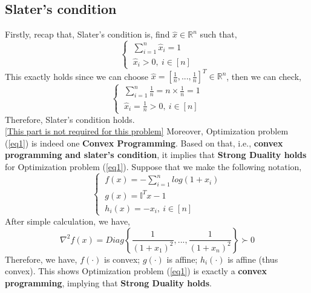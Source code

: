 \documentclass{article}
\begin{document}
\subsection{Slater's condition}
Firstly, recap that, Slater's condition is, find $\hat{x}\in \mathbb{R}^n $ such that,
\begin{equation}
	\nonumber
	\begin{cases}
		\  \sum_{i=1}^n \hat{x}_i = 1 \\
		\  \hat{x}_i > 0,\ i\in [n]
	\end{cases}
\end{equation}
This exactly holds since we can choose $\hat{x}=[\frac{1}{n},...,\frac{1}{n}]^T\in \mathbb{R}^n$, then we can check,
\begin{equation}
	\nonumber
	\begin{cases}
		\  \sum_{i=1}^n \frac{1}{n}  =n\times \frac{1}{n} = 1 \\
		\  \hat{x}_i=\frac{1}{n} > 0,\ i\in [n]
	\end{cases}
\end{equation}
Therefore, Slater's condition holds. 
\vspace{4pt}
\\
\underline{[This part is not required for this problem]} Moreover, Optimization problem (\ref{eq1}) is indeed one \textbf{Convex Programming}. Based on that, i.e., \textbf{convex programming and slater's condition}, it implies that \textbf{Strong Duality holds} for Optimization problem (\ref{eq1}). Suppose that we make the following notation,
\begin{equation}
	\nonumber
	\begin{cases}
	 \ 	f(x) =-\sum_{i=1}^{n} log(1+x_i) \\
	 \ 	g(x) = \mathbb{I}^Tx-1 \\
	\  	h_i(x) = -x_i, \ i \in [n]
	 \end{cases}
\end{equation} 
After simple calculation, we have,
\begin{equation}
	\nonumber
	\nabla^2 f(x) = Diag\left\{ \frac{1}{(1+x_1)^2},...,\frac{1}{(1+x_n)^2}\right\}\succ 0
\end{equation}
Therefore, we have, $f(\cdot)$ is convex; $g(\cdot)$ is affine; $h_i(\cdot)$ is affine (thus convex). This shows Optimization problem (\ref{eq1}) is exactly a \textbf{convex programming}, implying that \textbf{Strong Duality holds}.
\end{document}
